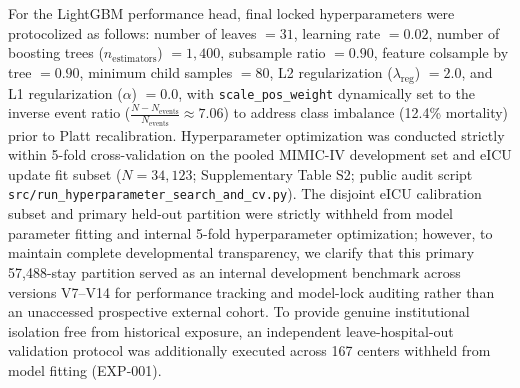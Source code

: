 \documentclass[utf8]{FrontiersinVancouver}
\newcommand{\re}[1]{#1}
\begin{document}
\re{For the LightGBM performance head, final locked hyperparameters were protocolized as follows: number of leaves $= 31$, learning rate $= 0.02$, number of boosting trees ($n_{\mathrm{estimators}}$) $= 1{,}400$, subsample ratio $= 0.90$, feature colsample by tree $= 0.90$, minimum child samples $= 80$, L2 regularization ($\lambda_{\mathrm{reg}}$) $= 2.0$, and L1 regularization ($\alpha$) $= 0.0$, with \texttt{scale\_pos\_weight} dynamically set to the inverse event ratio ($\frac{N - N_{\mathrm{events}}}{N_{\mathrm{events}}} \approx 7.06$) to address class imbalance (12.4\% mortality) prior to Platt recalibration. Hyperparameter optimization was conducted strictly within 5-fold cross-validation on the pooled MIMIC-IV development set and eICU update fit subset ($N=34{,}123$; Supplementary Table S2; public audit script \texttt{src/run\_hyperparameter\_search\_and\_cv.py}). The disjoint eICU calibration subset and primary held-out partition were strictly withheld from model parameter fitting and internal 5-fold hyperparameter optimization; however, to maintain complete developmental transparency, we clarify that this primary 57,488-stay partition served as an internal development benchmark across versions V7--V14 for performance tracking and model-lock auditing rather than an unaccessed prospective external cohort. To provide genuine institutional isolation free from historical exposure, an independent leave-hospital-out validation protocol was additionally executed across 167 centers withheld from model fitting (EXP-001).}
\end{document}
